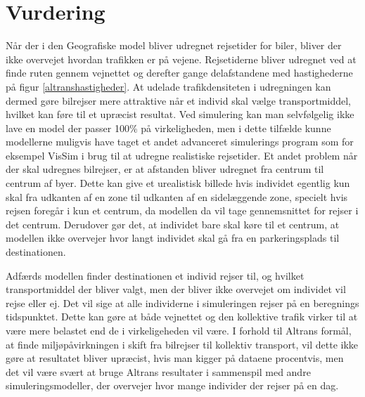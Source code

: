 

\section{Vurdering}
Når der i den Geografiske model bliver udregnet rejsetider for biler, bliver der ikke overvejet hvordan trafikken er på vejene. Rejsetiderne bliver udregnet ved at finde ruten gennem vejnettet og derefter gange delafstandene med hastighederne på figur \ref{altranshastigheder}. At udelade trafikdensiteten i udregningen kan dermed gøre bilrejser mere attraktive når et individ skal vælge transportmiddel, hvilket kan føre til et upræcist resultat. Ved simulering kan man selvfølgelig ikke lave en model der passer 100\% på virkeligheden, men i dette tilfælde kunne modellerne muligvis have taget et andet advanceret simulerings program som for eksempel VisSim i brug til at udregne realistiske rejsetider. Et andet problem når der skal udregnes bilrejser, er at afstanden bliver udregnet fra centrum til centrum af byer. Dette kan give et urealistisk billede hvis individet egentlig kun skal fra udkanten af en zone til udkanten af en sidelæggende zone, specielt hvis rejsen foregår i kun et centrum, da modellen da vil tage gennemsnittet for rejser i det centrum. Derudover gør det, at individet bare skal køre til et centrum, at modellen ikke overvejer hvor langt individet skal gå fra en parkeringsplads til destinationen. 

\vspace{5mm}

Adfærds modellen finder destinationen et individ rejser til, og hvilket transportmiddel der bliver valgt, men der bliver ikke overvejet om individet vil rejse eller ej. Det vil sige at alle individerne i simuleringen rejser på en beregnings tidspunktet. Dette kan gøre at både vejnettet og den kollektive trafik virker til at være mere belastet end de i virkeligeheden vil være. I forhold til Altrans formål, at finde miljøpåvirkningen i skift fra bilrejser til kollektiv transport, vil dette ikke gøre at resultatet bliver upræcist, hvis man kigger på dataene procentvis, men det vil være svært at bruge Altrans resultater i sammenspil med andre simuleringsmodeller, der overvejer hvor mange individer der rejser på en dag.

